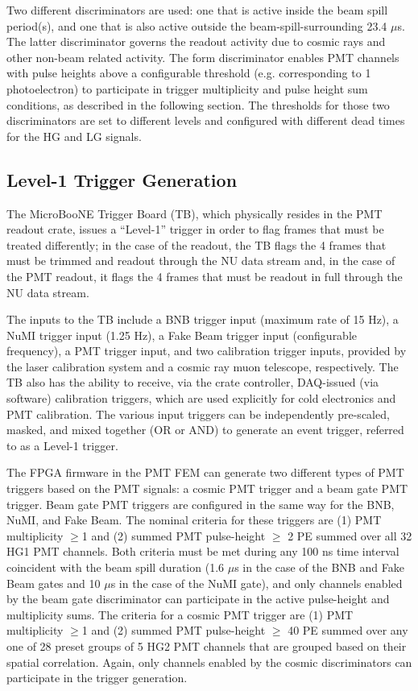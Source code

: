 Two different discriminators are used: one that is active inside the beam spill period(s), and one that is also active outside the beam-spill-surrounding 23.4 $\mu$s. The latter discriminator governs the readout activity due to cosmic rays and other non-beam related activity. The form discriminator enables PMT channels with pulse heights above a configurable threshold (e.g. corresponding to 1 photoelectron)  to participate in trigger multiplicity and pulse height sum conditions, as described in the following section. The thresholds for those two discriminators are set to different levels and configured with different dead times for the HG and LG signals.

\subsection{Level-1 Trigger Generation}
\label{sec:trigger}

The MicroBooNE Trigger Board (TB), which physically resides in the PMT readout crate, issues a ``Level-1'' trigger in order to flag frames that must be treated differently; in the case of the \lartpc readout, the TB flags the 4 frames that must be trimmed and readout through the NU data stream and, in the case of the PMT readout, it flags the 4 frames that must be readout in full through the NU data stream.

The inputs to the TB include a BNB trigger input (maximum rate of 15 Hz), a NuMI trigger input (1.25 Hz), a Fake Beam trigger input (configurable frequency), a PMT trigger input, and two calibration trigger inputs, provided by the laser calibration system and a cosmic ray muon telescope, respectively. The TB also has the ability to receive, via the crate controller, DAQ-issued (via software) calibration triggers, which are used explicitly for cold electronics and PMT calibration. The various input triggers can be independently pre-scaled, masked, and mixed together (OR or AND) to generate an event trigger, referred to as a Level-1 trigger.

The FPGA firmware in the PMT FEM can generate two different types of PMT triggers based on the PMT signals: a cosmic PMT trigger and a beam gate PMT trigger. Beam gate PMT triggers are configured in the same way for the BNB, NuMI, and Fake Beam. The nominal criteria for these triggers are (1) PMT multiplicity $\ge$1 and (2) summed PMT pulse-height $\ge$ 2 PE summed over all 32 HG1 PMT channels. Both criteria must be met during any 100 ns time interval coincident with the beam spill duration (1.6 $\mu$s in the case of the BNB and Fake Beam gates and 10 $\mu$s in the case of the NuMI gate), and only channels enabled by the beam gate discriminator can participate in the active pulse-height and multiplicity sums. The criteria for a cosmic PMT trigger are (1) PMT multiplicity $\ge$1 and (2) summed PMT pulse-height $\ge$ 40 PE summed over any one of 28 preset groups of 5 HG2 PMT channels that are grouped based on their spatial correlation. Again, only channels enabled by the cosmic discriminators can participate in the trigger generation.

